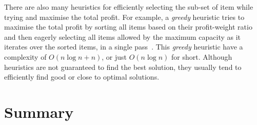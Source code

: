 There are also many heuristics for efficiently selecting the sub-set of item while trying and maximise the total profit.
For example, a \textit{greedy} heuristic tries to maximise the total profit by sorting all items based on their profit-weight ratio and then eagerly selecting all items allowed by the maximum capacity as it iterates over the sorted items, in a single pass~\citep{dantzig57}.
This \textit{greedy} heuristic have a complexity of $O(n\log{n} + n)$, or just $O(n\log{n})$ for short.
Although heuristics are not guaranteed to find the best solution, they usually tend to efficiently find good or close to optimal solutions.

\section{Summary}
